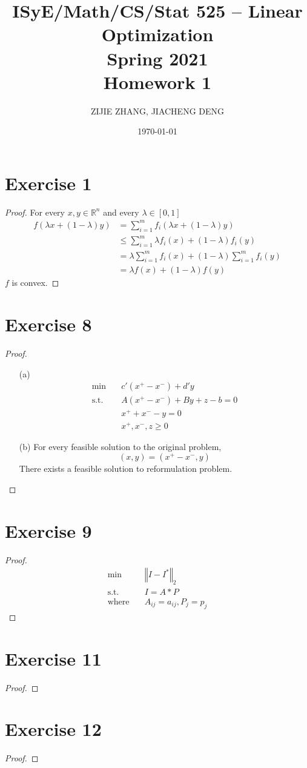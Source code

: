 \documentclass{article}
\title{ISyE/Math/CS/Stat 525 – Linear Optimization\\Spring 2021\\Homework 1}
\author{ZIJIE ZHANG, JIACHENG DENG}
\date\today
\begin{document}
\maketitle

\section*{Exercise 1}
	\begin{proof}
		For every $x, y\in \mathbb{R}^n$ and every $\lambda \in [0,1]$
		\begin{align*}
			f(\lambda x + (1-\lambda) y)
			&=\sum_{i=1}^m f_i(\lambda x + (1-\lambda) y)\\
			&\leqslant \sum_{i=1}^m \lambda f_i(x) + (1-\lambda) f_i(y)\\
			&=\lambda \sum_{i=1}^m f_i(x) + (1-\lambda)\sum_{i=1}^m f_i(y)\\
			&=\lambda f(x) + (1-\lambda)f(y)
		\end{align*}
		$f$ is convex.
	\end{proof}
\section*{Exercise 8}
	\begin{proof}
		\begin{itemize}
			\item[(a)]
			\begin{align*}
				\min\quad & c'(x^+ - x^-)+d'y\\
				\mbox{s.t.}\quad
				& A(x^+ - x^-)+By+z-b=0\\
				& x^+ + x^- - y=0\\
				& x^+, x^-, z\geqslant 0
			\end{align*}
			\item[(b)]
				For every feasible solution to the original problem,
				$$(x, y) = (x^+-x^-, y)$$
				There exists a feasible solution to reformulation problem.
		\end{itemize}
	\end{proof}
\section*{Exercise 9}
	\begin{proof}
		\begin{align*}
			\min\quad & \left\Vert I-I^* \right\Vert_2\\
			\mbox{s.t.}\quad
			& I = A * P\\
			\mbox{where}\quad
			& A_{ij} = a_{ij}, P_j = p_j
		\end{align*}
	\end{proof}
\section*{Exercise 11}
	\begin{proof}

	\end{proof}
\section*{Exercise 12}
	\begin{proof}

	\end{proof}
\end{document}
